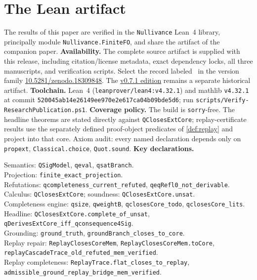\documentclass[11pt,a4paper]{article}
\newcommand{\lb}{\discretionary{}{}{}}
\theoremstyle{definition}
\newcommand{\lean}[1]{\texttt{#1}}
\newenvironment{leanrefs}
  {\par\smallskip\noindent\begin{minipage}{\linewidth}\small\raggedright}
  {\end{minipage}\par\smallskip}
\begin{document}
\appendix
\section{The Lean artifact}\label{app:lean}
The results of this paper are verified in the \lean{Nullivance} Lean~4
library, principally module \lean{Nullivance.FiniteFO}, and share the
artifact of the companion paper. \textbf{Availability.} The complete source
artifact is supplied with this release, including citation/license
metadata, exact dependency locks, all three manuscripts, and verification scripts.
Select the record labeled \PublicationVersion\ in the version family
\href{https://doi.org/10.5281/zenodo.18309848}{10.5281/zenodo.18309848}.
The \href{https://doi.org/10.5281/zenodo.21964600}{v0.7.1 edition}
remains a separate historical artifact.
\textbf{Toolchain.}
Lean~4 (\texttt{leanprover/lean4:v4.32.1}) and mathlib \texttt{v4.32.1} at
commit \texttt{520045ab14e26149ee970e2e617ca04b09bde5d6}; run
\texttt{scripts/Verify-ResearchPublication.ps1}. \textbf{Coverage policy.} The build is
\texttt{sorry}-free. The headline theorems are stated directly against
\lean{QClosesExtCore}; replay-certificate results use the separately defined
proof-object predicates of \cref{def:replay} and project into that core.
Axiom audit: every named declaration depends only on
\lean{propext}, \lean{Classical.choice}, \lean{Quot.sound}.
\textbf{Key declarations.}
\begin{leanrefs}
Semantics: \lean{QSigModel}, \lean{qeval}, \lean{qsatBranch}.\\
Projection: \lean{finite\_exact\_projection}.\\
Refutations: \lean{qcompleteness\_current\_refuted},
\lean{qeqRefl0\_not\_derivable}.\\
Calculus: \lean{QClosesExtCore};
soundness: \lean{QClosesExtCore.unsat}.\\
Completeness engine: \lean{qsize}, \lean{qweightB},
\lean{qclosesCore\_todo}, \lean{qclosesCore\_lits}.\\
Headline: \lean{QClosesExtCore.complete\_of\_unsat},\\
\quad\lean{qDerivesExtCore\_iff\_qconsequence4Sig}.\\
Grounding: \lean{ground\_truth},
\lean{groundBranch\_closes\_to\_core}.\\
Replay repair: \lean{ReplayClosesCoreMem},
\lean{ReplayClosesCoreMem.toCore},
\lean{replayCascadeTrace\_\lb old\_\lb refuted\_\lb mem\_\lb verified}.\\
Replay completeness: \lean{ReplayTrace.flat\_\lb closes\_\lb to\_\lb replay},
\lean{admissible\_\lb ground\_\lb replay\_\lb bridge\_\lb mem\_\lb verified}.
\end{leanrefs}

{\footnotesize


}
\end{document}
